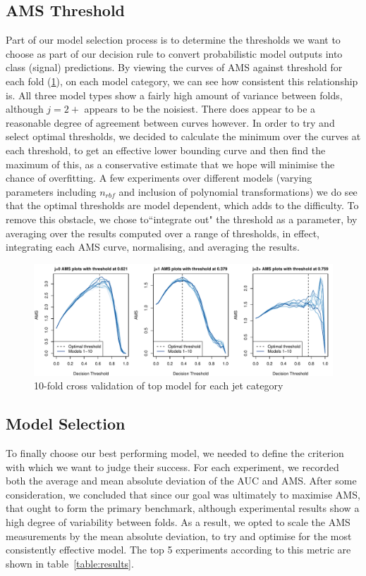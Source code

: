 \subsection{AMS Threshold}
Part of our model selection process is to determine the thresholds we want to choose as part of our decision rule to convert probabilistic model outputs into class (signal) predictions. By viewing the curves of AMS against threshold for each fold (\ref{fig:ams_curve}), on each model category, we can see how consistent this relationship is. All three model types show a fairly high amount of variance between folds, although $j=2+$ appears to be the noisiest. There does appear to be a reasonable degree of agreement between curves however. In order to try and select optimal thresholds, we decided to calculate the minimum over the curves at each threshold, to get an effective lower bounding curve and then find the maximum of this, as a conservative estimate that we hope will minimise the chance of overfitting. 
A few experiments over different models (varying parameters including $n_{rbf}$ and inclusion of polynomial transformations) we do see that the optimal thresholds are model dependent, which adds to the difficulty. To remove this obstacle, we chose to``integrate out" the threshold as a parameter, by averaging over the results computed over a range of thresholds, in effect, integrating each AMS curve, normalising, and averaging the results.


\begin{figure}[htbp]
    \begin{adjustbox}{max width=1.4\linewidth,center}
    \centering
	\includegraphics[width=1.2\textwidth]{CV_LogReg_AMS}
    \end{adjustbox}
    \caption{10-fold cross validation of top model for each jet category}
    \label{fig:ams_curve}
\end{figure}


\subsection{Model Selection}
To finally choose our best performing model, we needed to define the criterion with which we want to judge their success. For each experiment, we recorded both the average and mean absolute deviation of the AUC and AMS. After some consideration, we concluded that since our goal was ultimately to maximise AMS, that ought to form the primary benchmark, although experimental results show a high degree of variability between folds. As a result, we opted to scale the AMS measurements by the mean absolute deviation, to try and optimise for the most consistently effective model. The top 5 experiments according to this metric are shown in table~\ref{table:results}. 

